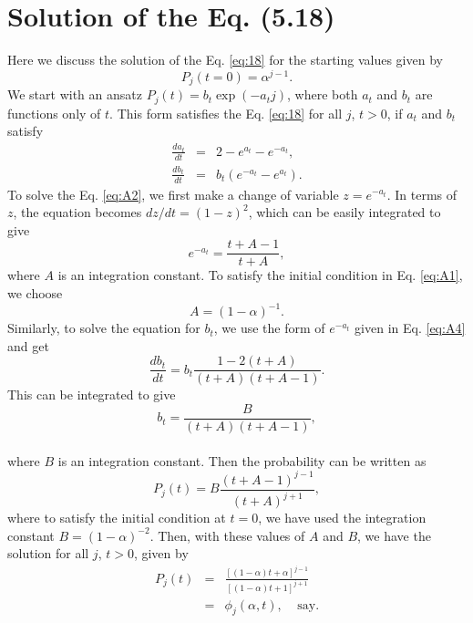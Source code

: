 \documentclass[11pt,a4paper]{book}
\begin{document}
\chapter{Solution of the Eq. (5.18)}\label{apndx:zhang}

Here we discuss the solution of the Eq. \eqref{eq:18} for the starting values 
given by  
\begin{equation}
  \label{eq:A1}
  P_j(t =0)=\alpha^{j-1}.
\end{equation}
We start with an ansatz $P_j(t)=b_t\exp(-a_tj)$, where both $a_t$ and $b_t$ are functions only of 
$t$. This form satisfies the Eq. \eqref{eq:18} for all $j$,
$t>0$, if $a_t$ and $b_t$ satisfy
\begin{eqnarray}
  \label{eq:A2}
  \frac{da_t}{dt}&=& 2-e^{a_t}-e^{-a_t}, \\
  \label{eq:A3}
  \frac{db_t}{dt}&=& b_t (e^{-a_t}-e^{a_t}).
\end{eqnarray}
To solve the Eq. \eqref{eq:A2}, we first make a change of variable $z=e^{-a_t}$. 
In terms of $z$, the equation becomes $dz/dt=(1-z)^2$, which can be easily integrated
to give
\begin{equation}
  \label{eq:A4}
  e^{-a_t}=\frac{t+A-1}{t+A},
\end{equation}
where $A$ is an integration constant. To satisfy the
initial condition in Eq. \eqref{eq:A1}, we choose 
\begin{equation}
  A=(1-\alpha)^{-1}.
\end{equation}
Similarly, to solve the equation for $b_t$, we use the form of $e^{-a_t}$ given in 
Eq. \eqref{eq:A4} and get
\begin{equation}
  \frac{db_t}{dt}= b_t\frac{1-2(t+A)}{(t+A)(t+A-1)}.
\end{equation}
This can be integrated to give
\begin{equation}
  b_t=\frac{B}{(t+A)(t+A-1)},
\end{equation}
\\
where $B$ is an integration constant. 
Then the probability can be written as 
\begin{equation}
  P_j(t)=B\frac{(t+A-1)^{j-1}}{(t+A)^{j+1}},
\end{equation}
where to satisfy the initial condition at $t=0$,
we have used the integration constant $B=(1-\alpha)^{-2}$.
Then, with these values of $A$ and $B$, we have the solution for all $j$, $t>0$, given by
\begin{eqnarray}
  \label{eq:A9}
  P_j(t)&=&\frac{\left[(1 -\alpha) t+\alpha \right]^{j-1}}{\left[ ( 1-\alpha) t+ 1 \right]^{j+1}}\nonumber\\
  &=&\phi_j(\alpha,t),\mathrm{~ ~ ~ ~ ~ say}.
\end{eqnarray}
\end{document}
